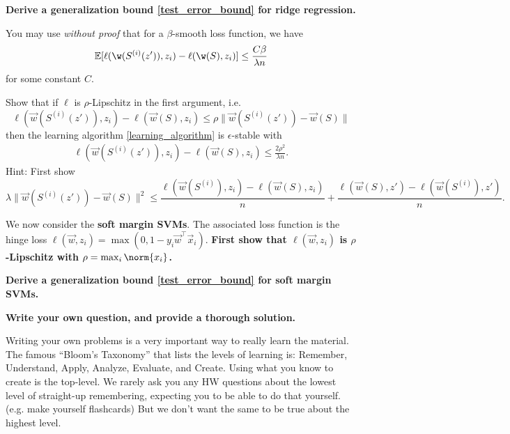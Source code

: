 \documentclass[preview]{standalone}
\begin{document}
\begin{Parts}
\item \textbf{Derive a generalization bound \eqref{test_error_bound} for ridge regression.}

You may use \emph{without proof} that for a $\beta$-smooth loss function,
we have
\begin{equation}\label{smooth_stability}
\E[\ell(\w(S^{(i)}(z')), z_i) - \ell(\w(S), z_i)] \leq \frac{C\beta}{\lambda n}
\end{equation}
for some constant $C$.



\item Show that if $\ell$ is $\rho$-Lipschitz in the first argument, i.e.
\begin{equation}
\ell(\vec w(S^{(i)}(z')), z_i) - \ell(\vec w(S), z_i) \leq \rho \lVert \vec w(S^{(i)}(z')) - \vec w(S) \rVert
\end{equation}
then the learning algorithm \eqref{learning_algorithm} is $\epsilon$-stable with
\begin{align*}
  \ell(\vec w(S^{(i)}(z')), z_i) - \ell(\vec w(S), z_i) \leq \frac{2\rho^2}{\lambda n}.
\end{align*}
Hint: First show
\begin{equation}\label{lipschitz_hint}
\lambda \lVert \vec w(S^{(i)}(z')) - \vec w(S)\rVert^2 \leq
\frac{\ell(\vec w(S^{(i)}), z_i) - \ell(\vec w(S), z_i)}{n} +
\frac{\ell(\vec w(S), z') - \ell(\vec w(S^{(i)}), z')}{n}.
\end{equation}



\item We now consider the {\bf soft margin SVMs}. The associated loss function is
the hinge loss $\ell(\vec w, z_i) = \max(0, 1-y_i \vec w^\top \vec x_i)$.
\textbf{First show that $\ell(\vec w, z_i)$ is $\rho$-Lipschitz with $\rho = \max_i\norm{x_i}$.}

\item \textbf{Derive a
generalization bound \eqref{test_error_bound} for soft margin SVMs.}







\end{Parts}


{\bf Write your own question, and provide a thorough solution.}

Writing your own problems is a very important way to really learn
the material. The famous ``Bloom's Taxonomy'' that lists the levels of
learning is: Remember, Understand, Apply, Analyze, Evaluate, and
Create. Using what you know to create is the top-level. We rarely ask
you any HW questions about the lowest level of straight-up
remembering, expecting you to be able to do that yourself. (e.g. make
yourself flashcards) But we don't want the same to be true about the
highest level.
\end{document}
